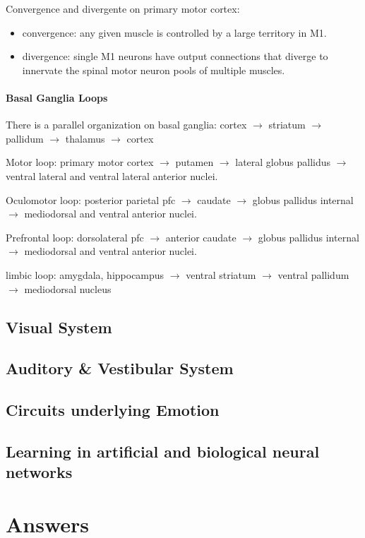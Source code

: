 \documentclass[12pt,article,oneside,a4paper]{memoir}
\begin{document}
Convergence and divergente on primary motor cortex:
\begin{itemize}
\item convergence: any given muscle is controlled by a large territory in M1.
\item divergence: single M1 neurons have output connections that diverge to innervate the spinal motor neuron pools of multiple muscles.
\end{itemize}


\paragraph{Basal Ganglia Loops}
There is a parallel organization on basal ganglia: cortex $\rightarrow$ striatum $\rightarrow$ pallidum $\rightarrow$ thalamus $\rightarrow$ cortex

Motor loop: primary motor cortex $\rightarrow$ putamen $\rightarrow$ lateral globus pallidus $\rightarrow$ ventral lateral and ventral lateral anterior nuclei.

Oculomotor loop: posterior parietal pfc $\rightarrow$ caudate $\rightarrow$ globus pallidus internal $\rightarrow$ mediodorsal and ventral anterior nuclei.

Prefrontal loop: dorsolateral pfc $\rightarrow$ anterior caudate $\rightarrow$ globus pallidus internal $\rightarrow$ mediodorsal and ventral anterior nuclei.

limbic loop: amygdala, hippocampus $\rightarrow$ ventral striatum $\rightarrow$ ventral pallidum $\rightarrow$ mediodorsal nucleus

\subsection{Visual System}
\subsection{Auditory \& Vestibular System}
\subsection{Circuits underlying Emotion}
\subsection{Learning in artificial and biological neural networks}

\section{Answers}
\end{document}
